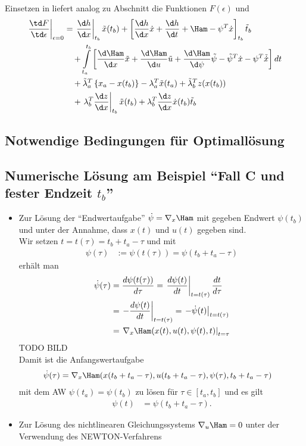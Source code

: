 Einsetzen in  liefert analog zu Abschnitt  die Funktionen $F(\epsilon)$ und
\begin{align*}
	\left.\frac{\td F}{\td \epsilon}\right|_{\epsilon=0} & = \left.\frac{\d h}{\d x}\right|_{t_b}\tilde{x}(t_b) + \left[\frac{\d h}{\d x}\dot{x} +
	\frac{\d h}{\d t}+\Ham - \psi^T\dot{x} \right]_{t_b}\tilde{t}_b\\ 
	& \quad + \int\limits_{t_a}^{t_b}\left[\frac{\d\Ham}{\d
	x}\tilde{x}+\frac{\d\Ham}{\d u}\tilde{u}+\frac{\d\Ham}{\d\psi}\tilde{\psi} - \tilde{\psi}^T\dot{x} - \psi^T\tilde{\dot{x}}\right]dt \\
	& \quad + \tilde{\lambda}_a^T\left\{x_a-x(t_b) \right\} - \lambda_a^T\tilde{x}(t_a)+\tilde{\lambda}_b^T z(x(t_b)) \\
	& \quad + \left.\lambda_b^T\frac{\d z}{\d x}\right|_{t_b}\tilde{x}(t_b)+\lambda_b^T\frac{\d z}{\d x}\dot{x}(t_b)\tilde{t}_b
\end{align*}

\subsection{Notwendige Bedingungen für Optimallösung}

\subsection{Numerische Lösung am Beispiel "`Fall C und fester Endzeit $t_b$"'}
\begin{itemize}
  \item Zur Lösung der "`Endwertaufgabe"' $\dot{\psi}=\nabla_x \Ham$ mit gegeben Endwert $\psi(t_b)$ und unter der Annahme, dass $x(t)$ und $u(t)$ gegeben sind.\\
  		Wir setzen $t=t(\tau)=t_b+t_a-\tau$ und mit 
  		\begin{align*}
  			\psi(\tau) & := \psi(t(\tau)) = \psi(t_b+t_a-\tau)
  		\end{align*}
  		erhält man 
  		\begin{align*}
  			\dot{\psi}(\tau) & = \frac{d\psi(t(\tau))}{d\tau} = \left.\frac{d\psi(t)}{dt}\right|_{t=t(\tau)}\frac{dt}{d\tau}\\
  			& = \left.-\frac{d\psi(t)}{dt}\right|_{t=t(\tau)}=\left.-\dot{\psi}(t)\right|_{t=t(\tau)}\\
  			& = \left.\nabla_x \Ham(x(t),u(t),\psi(t),t)\right|_{t=\tau}
  		\end{align*}
  		TODO BILD\\
  		Damit ist die Anfangswertaufgabe 
  		\begin{align*}
  			\dot{\psi}(\tau) & = \nabla_x \Ham(x(t_b+t_a-\tau),u(t_b+t_a-\tau),\psi(\tau),t_b+t_a-\tau)
  		\end{align*}
  		mit dem \ac{AW} $\psi(t_a)=\psi(t_b)$ zu lösen für $\tau\in[t_a,t_b]$ und es gilt
  		\begin{align*}
  		\psi(t) & = \psi(t_b+t_a-\tau).
  		\end{align*}
  \item Zur Lösung des nichtlinearen Gleichungssystems $\nabla_u \Ham =0$ unter der Verwendung des NEWTON-Verfahrens
\end{itemize}

